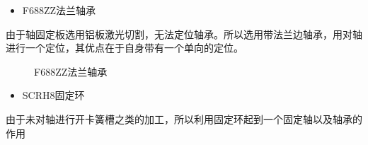 \documentclass[12pt]{article}
\begin{document}
\begin{CJK}{UTF8}{gbsn}
\begin{itemize}
\item F688ZZ法兰轴承
\end{itemize}
由于轴固定板选用铝板激光切割，无法定位轴承。所以选用带法兰边轴承，用对轴进行一个定位，其优点在于自身带有一个单向的定位。
\begin{figure}[H]
{}
\quad
{}
\caption{F688ZZ法兰轴承}
\end{figure}
\begin{itemize}
\item SCRH8固定环
\end{itemize}
由于未对轴进行开卡簧槽之类的加工，所以利用固定环起到一个固定轴以及轴承的作用
\begin{figure}[H]
{}
\end{figure}
\end{CJK}
\end{document}

